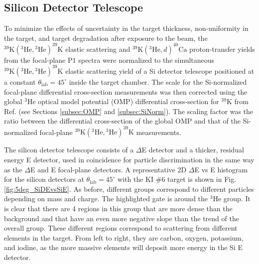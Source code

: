 \subsection{Silicon Detector Telescope}

To minimize the effects of uncertainty in the target thickness, non-uniformity in the target, and target degradation after exposure to the beam, the $^{39}\mathrm{K}(^{3}\mathrm{He}, {}^{3}\mathrm{He})^{39}\mathrm{K}$ elastic scattering and $^{39}\mathrm{K}(^{3}\mathrm{He}, d)^{40}\mathrm{Ca}$ proton-transfer yields from the focal-plane P1 spectra were normalized to the simultaneous $^{39}\mathrm{K}(^{3}\mathrm{He}, {}^{3}\mathrm{He})^{39}\mathrm{K}$ elastic scattering yield of a Si detector telescope positioned at a constant $\theta_{\mathrm{lab}} = 45^{\circ}$ inside the target chamber. The scale for the Si-normalized focal-plane differential cross-section measurements was then corrected using the global $^{3}\mathrm{He}$ optical model potential (OMP) differential cross-section for $^{39}\mathrm{K}$ from Ref. \cite{Liang2009} (see Sections \ref{subsec:OMP} and \ref{subsec:SiNorm}). The scaling factor was the ratio between the differential cross-section of the global OMP and that of the Si-normalized focal-plane $^{39}\mathrm{K}(^{3}\mathrm{He}, {}^{3}\mathrm{He})^{39}\mathrm{K}$ measurements.

The silicon detector telescope consists of a $\Delta$E detector and a thicker, residual energy E detector, used in coincidence for particle discrimination in the same way as the $\Delta$E and E focal-plane detectors. A representative 2D $\Delta$E vs E histogram for the silicon detectors at $\theta_{\mathrm{lab}} = 45^{\circ}$ with the KI $\#$6 target is shown in Fig. \ref{fig:5deg_SiDEvsSiE}. As before, different groups correspond to different particles depending on mass and charge. The highlighted gate is around the $^{3}$He group. It is clear that there are 4 regions in this group that are more dense than the background and that have an even more negative slope than the trend of the overall group. These different regions correspond to scattering from different elements in the target. From left to right, they are carbon, oxygen, potassium, and iodine, as the more massive elements will deposit more energy in the Si E detector. 

\def\yTS{1.175} %
\def\xTS{2.165} %
\def\sl{0.28} %
\def\su{0.4} %


